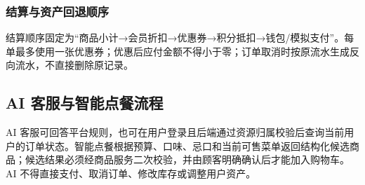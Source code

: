 \subsubsection{结算与资产回退顺序}


结算顺序固定为“商品小计→会员折扣→优惠券→积分抵扣→钱包/模拟支付”。每单最多使用一张优惠券；优惠后应付金额不得小于零；订单取消时按原流水生成反向流水，不直接删除原记录。

\subsection{AI 客服与智能点餐流程}


AI 客服可回答平台规则，也可在用户登录且后端通过资源归属校验后查询当前用户的订单状态。智能点餐根据预算、口味、忌口和当前可售菜单返回结构化候选商品；候选结果必须经商品服务二次校验，并由顾客明确确认后才能加入购物车。AI 不得直接支付、取消订单、修改库存或调整用户资产。
